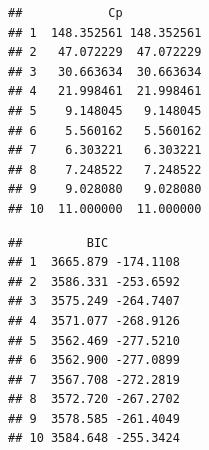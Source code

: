 \documentclass[
]{book}
\newenvironment{Shaded}{\begin{snugshade}}{\end{snugshade}}
\newcommand{\CommentTok}[1]{\textcolor[rgb]{0.56,0.35,0.01}{\textit{#1}}}
\newcommand{\DecValTok}[1]{\textcolor[rgb]{0.00,0.00,0.81}{#1}}
\newcommand{\KeywordTok}[1]{\textcolor[rgb]{0.13,0.29,0.53}{\textbf{#1}}}
\newcommand{\NormalTok}[1]{#1}
\newcommand{\OperatorTok}[1]{\textcolor[rgb]{0.81,0.36,0.00}{\textbf{#1}}}
\newcommand{\StringTok}[1]{\textcolor[rgb]{0.31,0.60,0.02}{#1}}
\begin{document}
\begin{Shaded}
\end{Shaded}

\begin{verbatim}
##            Cp           
## 1  148.352561 148.352561
## 2   47.072229  47.072229
## 3   30.663634  30.663634
## 4   21.998461  21.998461
## 5    9.148045   9.148045
## 6    5.560162   5.560162
## 7    6.303221   6.303221
## 8    7.248522   7.248522
## 9    9.028080   9.028080
## 10  11.000000  11.000000
\end{verbatim}

\begin{Shaded}
\end{Shaded}

\begin{verbatim}
##         BIC          
## 1  3665.879 -174.1108
## 2  3586.331 -253.6592
## 3  3575.249 -264.7407
## 4  3571.077 -268.9126
## 5  3562.469 -277.5210
## 6  3562.900 -277.0899
## 7  3567.708 -272.2819
## 8  3572.720 -267.2702
## 9  3578.585 -261.4049
## 10 3584.648 -255.3424
\end{verbatim}
\end{document}
